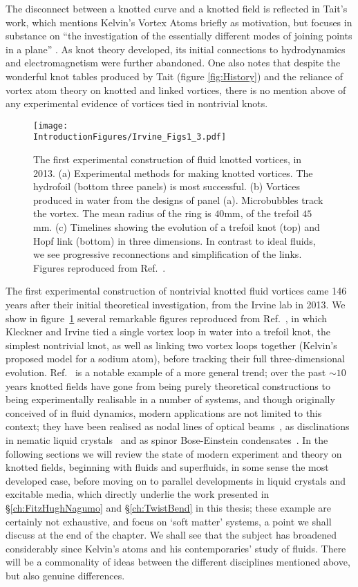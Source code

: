 The disconnect between a knotted curve and a knotted field is reflected in Tait's work, which mentions Kelvin's Vortex Atoms briefly as motivation, but focuses in substance on ``the investigation of the essentially different modes of joining points in a plane'' \citep{Tait1}. As knot theory developed, its initial connections to hydrodynamics and electromagnetism were further abandoned. One also notes that despite the wonderful knot tables produced by Tait (figure \ref{fig:History}) and the reliance of vortex atom theory on knotted and linked vortices, there is no mention above of any experimental evidence of vortices tied in nontrivial knots. 
\begin{figure}[htbp]
\centering
\texttt{[image: \\IntroductionFigures/Irvine\_Figs1\_3.pdf]}
\caption{The first experimental construction of fluid knotted vortices, in 2013. (a) Experimental methods for making knotted vortices. The hydrofoil (bottom three panels) is most successful. (b) Vortices produced in water from the designs of panel (a). Microbubbles track the vortex. The mean radius of the ring is $40$mm, of the trefoil $45$mm. (c) Timelines showing the evolution of a trefoil knot (top) and Hopf link (bottom) in three dimensions. In contrast to ideal fluids, we see progressive reconnections and simplification of the links. Figures reproduced from Ref.~\citep{Kleckner2013}.}
\label{fig:Irvine}
\end{figure}

The first experimental construction of nontrivial knotted fluid vortices came 146 years after their initial theoretical investigation, from the Irvine lab in 2013. We show in figure~\ref{fig:Irvine} several remarkable figures reproduced from Ref.~\citep{Kleckner2013}, in which Kleckner and Irvine tied a single vortex loop in water into a trefoil knot, the simplest nontrivial knot, as well as linking two vortex loops together (Kelvin's proposed model for a sodium atom), before tracking their full three-dimensional evolution. Ref.~\citep{Kleckner2013} is a notable example of a more general trend; over the past $\sim10$ years knotted fields have gone from being purely theoretical constructions to being experimentally realisable in a number of systems, and though originally conceived of in fluid dynamics, modern applications are not limited to this context; they have been realised as nodal lines of optical beams~\citep{Dennis2010}, as disclinations in nematic liquid crystals~\citep{Tkalec2011,Tasinkevych2014,Copar2015} and as spinor Bose-Einstein condensates~\citep{Hall2016}. In the following sections we will review the state of modern experiment and theory on knotted fields, beginning with fluids and superfluids, in some sense the most developed case, before moving on to parallel developments in liquid crystals and excitable media, which directly underlie the work presented in \S \ref{ch:FitzHughNagumo} and \S \ref{ch:TwistBend} in this thesis; these example are certainly not exhaustive, and focus on `soft matter' systems, a point we shall discuss at the end of the chapter. We shall see that the subject has broadened considerably since Kelvin's atoms and his contemporaries' study of fluids. There will be a commonality of ideas between the different disciplines mentioned above, but also genuine differences.
